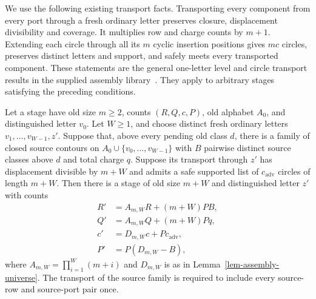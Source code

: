 We use the following existing transport facts. Transporting every
component from every port through a fresh ordinary letter preserves
closure, displacement divisibility and coverage. It multiplies row and
charge counts by $m+1$. Extending each circle through all its $m$ cyclic
insertion positions gives $mc$ circles, preserves distinct letters and
support, and safely meets every transported component. These statements
are the general one-letter level and circle transport results in the
supplied assembly library~\cite{halfar-assembly}. They apply to arbitrary
stages satisfying the preceding conditions.

\begin{lemma}\label{lem-assembly-width}
Let a stage have old size $m\ge2$, counts $(R,Q,c,P)$, old alphabet
$A_0$, and distinguished letter $v_0$. Let $W\ge1$, and choose distinct
fresh ordinary letters $v_1,\ldots,v_{W-1},z'$. Suppose that, above
every pending old class $d$, there is a family of closed source contours
on $A_0\cup\{v_0,\ldots,v_{W-1}\}$ with $B$ pairwise distinct source
classes above $d$ and total charge $q$. Suppose its transport through
$z'$ has displacement divisible by $m+W$ and admits a safe supported
list of $c_{\mathrm{adv}}$ circles of length $m+W$.
Then there is a stage of old size $m+W$ and distinguished letter $z'$
with counts
\begin{align*}
 R'&=A_{m,W}R+(m+W)PB,\\
 Q'&=A_{m,W}Q+(m+W)Pq,\\
 c'&=D_{m,W}c+Pc_{\mathrm{adv}},\\
 P'&=P(D_{m,W}-B),
\end{align*}
where $A_{m,W}=\prod_{i=1}^{W}(m+i)$ and $D_{m,W}$ is as in
Lemma~\ref{lem-assembly-universe}. The transport of the source family
is required to include every source-row and source-port pair once.
\end{lemma}

